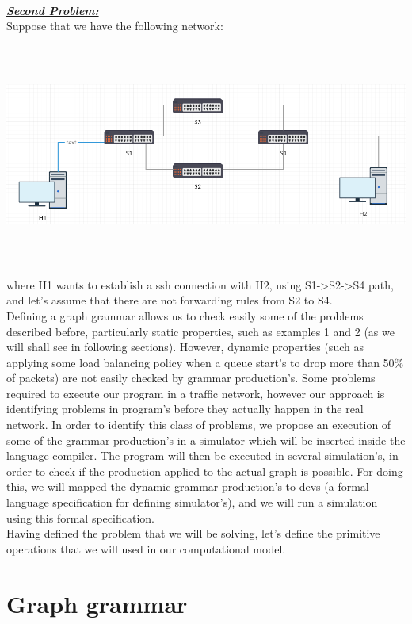 \documentclass[envcountsect,runningheads]{llncs}
\begin{document}
\\
\textbf{\underline{\textit{Second Problem:}}} \\
Suppose that we have the following network:\\
\includegraphics[width=\textwidth, height=8cm]{second_example.png}\\
where H1 wants to establish a ssh connection with H2, using S1->S2->S4 path, and 
let's assume that there are not forwarding rules from S2 to S4. 
\\

Defining a graph grammar allows us to check easily some of the problems described 
before, particularly static properties, such as examples 1 and 2 (as we will shall see in following
sections). However, dynamic properties (such as applying some load balancing policy when a 
queue start's to drop more than 50\% of packets) are not easily checked by grammar 
production's. Some problems required to execute our program in a traffic network, 
however our approach is identifying problems in program's before they actually 
happen in the real network. In order to identify this class of problems, we 
propose an execution of some of the grammar production's in a simulator which 
will be inserted inside the language compiler. The program will then be executed 
in several simulation's, in order to check if the production applied to the actual graph is 
possible. For doing this, we will mapped the dynamic grammar production's to 
devs (a formal language specification for defining simulator's), and we will run a simulation 
using this formal specification.\\
Having defined the problem that we will be solving, let's define the primitive 
operations that we will used in our computational model.

\section{Graph grammar}
\end{document}
